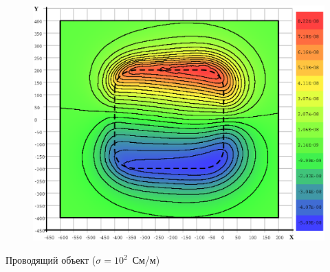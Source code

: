 \documentclass[aspectratio=43,usepdftitle=false]{beamer}
\begin{document}
\begin{frame}
\begin{columns}[t,totalwidth=\linewidth]
\begin{column}{.5\linewidth}
			\vspace{-2.75em}
			\begin{figure}[H]
				\includegraphics[width=1.1\textwidth,height=1.1\textheight,keepaspectratio]{200_yes_z=-601_EzR.eps}
			\end{figure}
			\begin{center}
				\vspace{-1em}
				\tiny{Проводящий объект ($\sigma = 10^{2}$~См/м)}
			\end{center}
		\end{column}
	\end{columns}
\end{frame}

\end{document}
